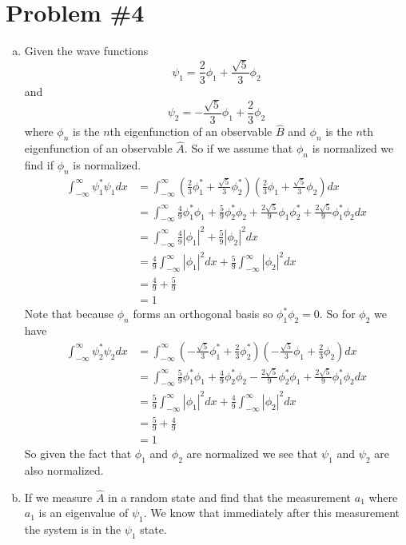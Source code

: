 \documentclass[11pt]{article}
\numberwithin{equation}{section}
\begin{document}
\section{Problem \#4}
\begin{enumerate}[(a)]
\item
Given the wave functions
$$\psi_1 = \frac{2}{3}\phi_1+\frac{\sqrt{5}}{3}\phi_2$$
and
$$\psi_2 = -\frac{\sqrt{5}}{3}\phi_1+\frac{2}{3}\phi_2$$
where $\phi_n$ is the $n$th eigenfunction of an observable $\hat{B}$ and $\phi_n$ is the $n$th eigenfunction of an observable $\hat{A}$. So if we assume that $\phi_n$ is normalized we find if $\phi_n$ is normalized.
\begin{align*}
\int_{-\infty}^{\infty}\psi_1^*\psi_1dx &= \int_{-\infty}^{\infty}\left(\frac{2}{3}\phi_1^*+\frac{\sqrt{5}}{3}\phi_2^*\right)\left(\frac{2}{3}\phi_1+\frac{\sqrt{5}}{3}\phi_2\right) dx\\
&= \int_{-\infty}^{\infty}\frac{4}{9}\phi_1^*\phi_1+\frac{5}{9}\phi_2^*\phi_2 + \frac{2\sqrt{5}}{9}\phi_1\phi_2^*+\frac{2\sqrt{5}}{9}\phi_1^*\phi_2 dx\\
&= \int_{-\infty}^{\infty}\frac{4}{9}|\phi_1|^2+\frac{5}{9}|\phi_2|^2dx \\
&= \frac{4}{9}\int_{-\infty}^{\infty}|\phi_1|^2dx+\frac{5}{9}\int_{-\infty}^{\infty}|\phi_2|^2dx \\
&= \frac{4}{9}+\frac{5}{9} \\
&= 1
\end{align*}
Note that because $\phi_n$ forms an orthogonal basis so $\phi_1^*\phi_2 = 0$. So for $\phi_2$ we have
\begin{align*}
\int_{-\infty}^{\infty}\psi_2^*\psi_2dx &= \int_{-\infty}^{\infty}\left(-\frac{\sqrt{5}}{3}\phi_1^*+\frac{2}{3}\phi_2^*\right)\left(-\frac{\sqrt{5}}{3}\phi_1+\frac{2}{3}\phi_2\right)dx\\
&= \int_{-\infty}^{\infty}\frac{5}{9}\phi_1^*\phi_1 + \frac{4}{9}\phi_2^*\phi_2 - \frac{2\sqrt{5}}{9}\phi_2^*\phi_1+\frac{2\sqrt{5}}{9}\phi_1^*\phi_2dx\\
&= \frac{5}{9}\int_{-\infty}^{\infty}|\phi_1|^2dx + \frac{4}{9}\int_{-\infty}^{\infty}|\phi_2|^2dx\\
&= \frac{5}{9} + \frac{4}{9}\\
&= 1
\end{align*}
So given the fact that $\phi_1$ and $\phi_2$ are normalized we see that $\psi_1$ and $\psi_2$ are also normalized.

\item
If we measure $\hat{A}$ in a random state and find that the measurement $a_1$ where $a_1$ is an eigenvalue of $\psi_1$. We know that immediately after this measurement the system is in the $\psi_1$ state. 


\end{enumerate}
\end{document}
